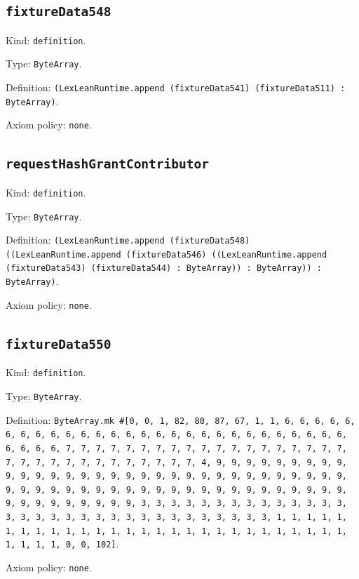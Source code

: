 \documentclass[11pt]{article}
\begin{document}
\subsection*{\texttt{fixtureData548}}
\noindent Kind: \texttt{definition}.\par
\noindent Type: \texttt{ByteArray}.\par
\noindent Definition: \texttt{(LexLeanRuntime.append (fixtureData541) (fixtureData511) : ByteArray)}.\par
\noindent Axiom policy: \texttt{none}.\par
\subsection*{\texttt{requestHashGrantContributor}}
\noindent Kind: \texttt{definition}.\par
\noindent Type: \texttt{ByteArray}.\par
\noindent Definition: \texttt{(LexLeanRuntime.append (fixtureData548) ((LexLeanRuntime.append (fixtureData546) ((LexLeanRuntime.append (fixtureData543) (fixtureData544) : ByteArray)) : ByteArray)) : ByteArray)}.\par
\noindent Axiom policy: \texttt{none}.\par
\subsection*{\texttt{fixtureData550}}
\noindent Kind: \texttt{definition}.\par
\noindent Type: \texttt{ByteArray}.\par
\noindent Definition: \texttt{ByteArray.mk \#[0, 0, 1, 82, 80, 87, 67, 1, 1, 6, 6, 6, 6, 6, 6, 6, 6, 6, 6, 6, 6, 6, 6, 6, 6, 6, 6, 6, 6, 6, 6, 6, 6, 6, 6, 6, 6, 6, 6, 6, 6, 7, 7, 7, 7, 7, 7, 7, 7, 7, 7, 7, 7, 7, 7, 7, 7, 7, 7, 7, 7, 7, 7, 7, 7, 7, 7, 7, 7, 7, 7, 7, 7, 4, 9, 9, 9, 9, 9, 9, 9, 9, 9, 9, 9, 9, 9, 9, 9, 9, 9, 9, 9, 9, 9, 9, 9, 9, 9, 9, 9, 9, 9, 9, 9, 9, 9, 9, 9, 9, 9, 9, 9, 9, 9, 9, 9, 9, 9, 9, 9, 9, 9, 9, 9, 9, 9, 9, 9, 9, 9, 9, 9, 9, 9, 9, 9, 9, 3, 3, 3, 3, 3, 3, 3, 3, 3, 3, 3, 3, 3, 3, 3, 3, 3, 3, 3, 3, 3, 3, 3, 3, 3, 3, 3, 3, 3, 3, 3, 3, 1, 1, 1, 1, 1, 1, 1, 1, 1, 1, 1, 1, 1, 1, 1, 1, 1, 1, 1, 1, 1, 1, 1, 1, 1, 1, 1, 1, 1, 1, 1, 1, 0, 0, 102]}.\par
\noindent Axiom policy: \texttt{none}.\par
\end{document}
